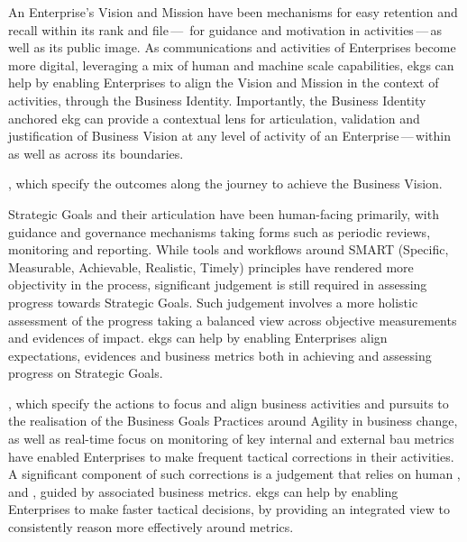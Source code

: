 An Enterprise’s Vision and Mission have been mechanisms for easy retention and recall within its rank and file\,---\,%
for guidance and motivation in activities\,---\,as well as its public image.
As communications and activities of Enterprises become more digital, leveraging a mix of human and machine scale
capabilities, \glspl{ekg} can help by enabling Enterprises to align the Vision and Mission in the context of activities,
through the Business Identity.
Importantly, the Business Identity anchored \gls{ekg} can provide a contextual lens for articulation,
validation and justification of Business Vision at any level of activity of an Enterprise\,---\,within as well as
across its boundaries.

\textbf{}, which specify the outcomes along the journey to achieve the
Business Vision.

Strategic Goals and their articulation have been human-facing primarily, with guidance and governance mechanisms
taking forms such as periodic reviews, monitoring and reporting.
While tools and workflows around SMART (Specific, Measurable, Achievable, Realistic, Timely) principles have
rendered more objectivity in the process, significant judgement is still required in assessing progress towards
Strategic Goals.
Such judgement involves a more holistic assessment of the progress taking a balanced view across objective measurements
and evidences of impact.
\Glspl{ekg} can help by enabling Enterprises align expectations, evidences and business metrics both in achieving
and assessing progress on Strategic Goals.

\textbf{}, which specify the actions to focus and align business activities and
pursuits to the realisation of the Business Goals Practices around Agility in business change,
as well as real-time focus on monitoring of key internal and external \gls{bau} metrics have enabled Enterprises
to make frequent tactical corrections in their activities.
A significant component of such corrections is a judgement that relies on human , 
and , guided by associated business metrics.
\Glspl{ekg} can help by enabling Enterprises to make faster tactical decisions, by providing an integrated view to
consistently reason more effectively around metrics.

